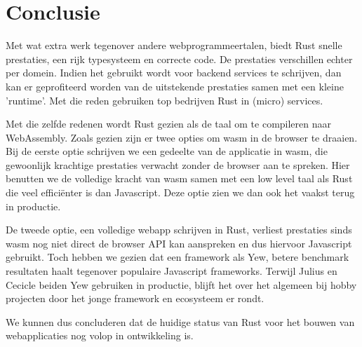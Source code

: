\chapter{Conclusie}

Met wat extra werk tegenover andere webprogrammeertalen, biedt Rust snelle prestaties, een rijk
typesysteem en correcte code. De prestaties verschillen echter per domein. Indien het gebruikt wordt
voor backend services te schrijven, dan kan er geprofiteerd worden van de uitstekende prestaties
samen met een kleine 'runtime'. Met die reden gebruiken top bedrijven Rust in (micro) services.

Met die zelfde redenen wordt Rust gezien als de taal om te compileren naar WebAssembly. Zoals gezien
zijn er twee opties om wasm in de browser te draaien. Bij de eerste optie schrijven we een gedeelte
van de applicatie in wasm, die gewoonlijk krachtige prestaties verwacht zonder de browser aan te
spreken. Hier benutten we de volledige kracht van wasm samen met een low level taal als Rust
die veel efficiënter is dan Javascript. Deze optie zien we dan ook het vaakst terug in productie.

De tweede optie, een volledige webapp schrijven in Rust, verliest prestaties sinds wasm nog niet
direct de browser API kan aanspreken en dus hiervoor Javascript gebruikt. Toch hebben we gezien dat
een framework als Yew, betere benchmark resultaten haalt tegenover populaire Javascript frameworks.
Terwijl Julius en Cecicle beiden Yew gebruiken in productie, blijft het over het algemeen bij hobby
projecten door het jonge framework en ecosysteem er rondt.

We kunnen dus concluderen dat de huidige status van Rust voor het bouwen van webapplicaties nog
volop in ontwikkeling is.
